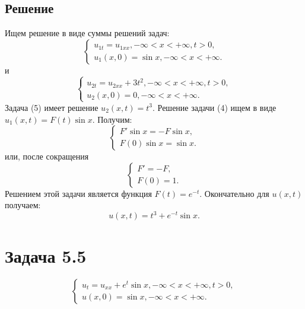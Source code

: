 \documentclass[11pt]{article}
\begin{document}
\subsection{Решение}
\label{sec:orgb28c910}
Ищем решение в виде суммы решений задач:
\begin{equation}
\begin{cases}
u_{1t} = u_{1xx}, -\infty < x < +\infty, t > 0, \\
u_1(x, 0) = \sin x, -\infty < x < +\infty.
\end{cases}
\end{equation}
и
\begin{equation}
\begin{cases}
u_{2t} = u_{2xx} + 3t^2, -\infty < x < +\infty, t > 0, \\
u_2(x, 0) = 0, -\infty < x < +\infty.
\end{cases}
\end{equation}
Задача (5) имеет решение $u_2(x, t) = t^3$. Решение задачи (4) ищем в виде $u_1(x, t) = F(t)\sin x$.
Получим:
\begin{equation*}
\begin{cases}
F'\sin x = -F\sin x, \\
F(0)\sin x = \sin x.
\end{cases}
\end{equation*}
или, после сокращения
\begin{equation}
\begin{cases}
F' = -F, \\
F(0) = 1.
\end{cases}
\end{equation}
Решением этой задачи является функция $F(t) = e^{-t}$. Окончательно для $u(x, t)$ получаем:
\begin{equation}
u(x, t) = t^3 + e^{-t}\sin x.
\end{equation}
\section{Задача 5.5}
\label{sec:org10ed555}
\begin{equation}
\begin{cases}
u_t = u_{xx} + e^t\sin x, -\infty < x < +\infty, t > 0, \\
u(x, 0) = \sin x, -\infty < x < +\infty.
\end{cases}
\end{equation}
\end{document}
